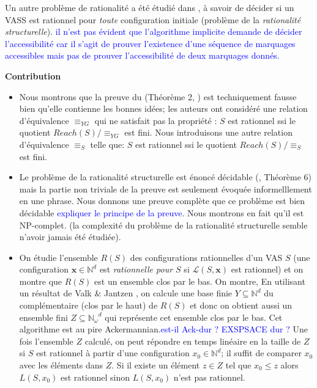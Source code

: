 \documentclass[a4paper,final]{article}
\theoremstyle{definition}
\let\leq\leqslant
\newcommand{\alain}[1]{\textcolor{blue}{#1}}
\newcommand{\N}{\ensuremath{\mathbb{N}}}
\newcommand{\Nomega}{\ensuremath{\mathbb{N}_\omega}}
\newcommand{\lang}{\ensuremath{\mathcal{L}}}
\newcommand{\vect}[1]{\ensuremath{\mathbf{#1}}}
\begin{document}
Un autre problème de rationalité a été étudié dans  \cite{vavn81}, à savoir de décider si un VASS est rationnel pour \emph{toute} configuration initiale (problème de la  \emph{rationalité structurelle}).
\alain{il n'est pas évident que l'algorithme implicite demande de décider l'accessibilité car il s'agit de prouver l'existence d'une séquence de marquages accessibles mais pas de prouver l'accessibilité de deux marquages donnés.} 


{\bf Contribution}
\begin{itemize}
\item Nous montrons que la preuve du (Théorème 2, \cite{giyo80}) est techniquement fausse bien qu'elle contienne les bonnes idées; les auteurs ont considéré une relation d'équivalence $\equiv_{YG}$ qui ne satisfait pas la propriété : $S$ est rationnel ssi  le quotient $Reach(S)/\equiv_{YG}$ est fini. Nous introduisons une autre relation d'équivalence $\equiv_S$ telle que: $S$ est rationnel ssi  le quotient $Reach(S)/\equiv_S$ est fini.
    \item  Le problème de la rationalité structurelle est énoncé décidable (\cite{vavn81}, Théorème 6) mais la partie non triviale de la preuve est seulement évoquée informelllement en une phrase. Nous donnons une preuve complète que ce problème est bien décidable  \alain{expliquer le principe de la preuve}. Nous montrons en fait qu'il est NP-complet.  (la complexité du problème de la rationalité structurelle semble n'avoir jamais été étudiée). 
  
    \item On étudie l'ensemble $R(S)$ des configurations rationnelles d'un VAS $S$ (une configuration $\vect{x} \in \N^d$ est \emph{rationnelle pour $S$} si $\lang(S,\vect{x})$ est rationnel) et on montre que $R(S)$ est un ensemble clos par le bas. On montre, En utilisant un résultat de Valk \& Jantzen \cite{vaja85}, on calcule une base finie $Y \subseteq \N^d$ du complémentaire (clos par le haut) de $R(S)$ et donc on obtient aussi un ensemble fini $Z \subseteq \Nomega^d$ qui représente cet ensemble clos par le bas. Cet algorithme est au pire Ackermannian.\alain{est-il Ack-dur ? EXSPSACE dur ?}
Une fois l'ensemble $Z$ calculé, on peut répondre en temps linéaire en la taille de $Z$ si $S$ est rationnel à partir d'une configuration $x_0 \in \N^d$; il suffit de comparer $x_0$ avec les éléments dans $Z$. Si il existe un élément $z \in Z$ tel que $x_0 \leq z$ alors $L(S,x_0)$ est rationnel sinon $L(S,x_0)$ n'est pas rationnel. 

\end{itemize}
\iffalse
\end{document}
